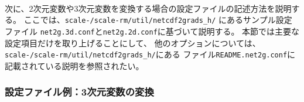 \\

次に、2次元変数や3次元変数を変換する場合の設定ファイルの記述方法を説明する。
ここでは、\texttt{scale-\version/scale-rm/util/netcdf2grads\_h/} にあるサンプル設定ファイル
\verb|net2g.3d.conf|と\verb|net2g.2d.conf|に基づいて説明する。
本節では主要な設定項目だけを取り上げることにして、
他のオプションについては、\texttt{scale-\version/scale-rm/util/netcdf2grads\_h/}にある
ファイル\verb|README.net2g.conf|に記載されている説明を参照されたい。


\subsubsection{設定ファイル例：3次元変数の変換}

